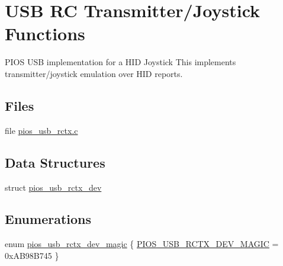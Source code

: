 \hypertarget{group___p_i_o_s___u_s_b___r_c_t_x}{\section{U\-S\-B R\-C Transmitter/\-Joystick Functions}
\label{group___p_i_o_s___u_s_b___r_c_t_x}
}


P\-I\-O\-S U\-S\-B implementation for a H\-I\-D Joystick  This implements transmitter/joystick emulation over H\-I\-D reports.  


\subsection*{Files}
\begin{DoxyCompactItemize}
\item 
file \hyperlink{pios__usb__rctx_8c}{pios\-\_\-usb\-\_\-rctx.\-c}
\end{DoxyCompactItemize}
\subsection*{Data Structures}
\begin{DoxyCompactItemize}
\item 
struct \hyperlink{structpios__usb__rctx__dev}{pios\-\_\-usb\-\_\-rctx\-\_\-dev}
\end{DoxyCompactItemize}
\subsection*{Enumerations}
\begin{DoxyCompactItemize}
\item 
enum \hyperlink{group___p_i_o_s___u_s_b___r_c_t_x_gab6be8817fc2ea56ea36728686255d0dc}{pios\-\_\-usb\-\_\-rctx\-\_\-dev\-\_\-magic} \{ \hyperlink{group___p_i_o_s___u_s_b___r_c_t_x_ggab6be8817fc2ea56ea36728686255d0dca115996decde68a659be5dc66ac2f669b}{P\-I\-O\-S\-\_\-\-U\-S\-B\-\_\-\-R\-C\-T\-X\-\_\-\-D\-E\-V\-\_\-\-M\-A\-G\-I\-C} = 0x\-A\-B98\-B745
 \}
\end{DoxyCompactItemize}
